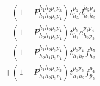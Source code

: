 \documentclass{article}
\begin{document}
{\begin{align}
                                    &- \left(1- P^{ h_{1} h_{2} p_{4} p_{3}}_{ h_{1} h_{2} p_{3} p_{4}} \right) t ^{ p_{3} } _{ h_{5} } d ^{ h_{5} p_{4} } _{ h_{1} h_{2} }\tag{cc2\_t2\_2}\\
                                    &- \left(1- P^{ h_{1} h_{2} p_{3} p_{4}}_{ h_{2} h_{1} p_{3} p_{4}} \right) t ^{ p_{5} } _{ h_{1} } e ^{ p_{3} p_{4} } _{ h_{2} p_{5} }\tag{cc2\_t2\_3}\\
                                    &- \left(1- P^{ h_{1} h_{2} p_{3} p_{4}}_{ h_{2} h_{1} p_{3} p_{4}} \right) t ^{ p_{3} p_{4} } _{ h_{1} h_{5} } f ^{ h_{5} } _{ h_{2} }\tag{cc2\_t2\_4}\\
                                    &+ \left(1- P^{ h_{1} h_{2} p_{4} p_{3}}_{ h_{1} h_{2} p_{3} p_{4}} \right) t ^{ p_{3} p_{5} } _{ h_{1} h_{2} } f ^{ p_{4} } _{ p_{5} }\tag{cc2\_t2\_5}
\end{align}
}
\end{document}

